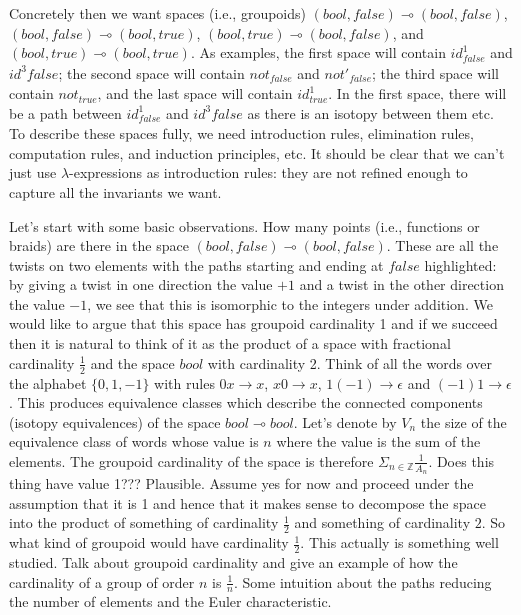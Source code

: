 \documentclass[11pt]{article}
\newcommand{\lolli}{\multimap}
\newcommand{\boolt}{\mathit{bool}}
\newcommand{\ffv}{\mathit{false}}
\newcommand{\ttv}{\mathit{true}}
\newcommand{\notb}{\mathit{not}}
\newcommand{\idc}{\mathit{id}}
\begin{document}
Concretely then we want spaces (i.e., groupoids) $(\boolt,\ffv) \lolli
(\boolt,\ffv)$, $(\boolt,\ffv) \lolli (\boolt,\ttv)$, $(\boolt,\ttv) \lolli
(\boolt,\ffv)$, and $(\boolt,\ttv) \lolli (\boolt,\ttv)$. As examples, the
first space will contain $\idc^1_{\ffv}$ and $\idc^3{\ffv}$; the second space
will contain $\notb_{\ffv}$ and $\notb'_{\ffv}$; the third space will contain
$\notb_{\ttv}$, and the last space will contain $\idc^1_{\ttv}$. In the first
space, there will be a path between $\idc^1_{\ffv}$ and $\idc^3{\ffv}$ as
there is an isotopy between them etc. To describe these spaces fully, we need
introduction rules, elimination rules, computation rules, and induction
principles, etc. It should be clear that we can't just use
$\lambda$-expressions as introduction rules: they are not refined enough to
capture all the invariants we want.

Let's start with some basic observations. How many points (i.e., functions or
braids) are there in the space $(\boolt,\ffv) \lolli (\boolt,\ffv)$. These
are all the twists on two elements with the paths starting and ending at
$\ffv$ highlighted: by giving a twist in one direction the value $+1$ and a
twist in the other direction the value $-1$, we see that this is isomorphic
to the integers under addition. We would like to argue that this space has
groupoid cardinality 1 and if we succeed then it is natural to think of it as
the product of a space with fractional cardinality $\frac{1}{2}$ and the
space $\boolt$ with cardinality 2. Think of all the words over the alphabet
$\{ 0, 1, -1\}$ with rules $0x\rightarrow x$, $x0\rightarrow x$,
$1(-1)\rightarrow\epsilon$ and $(-1)1\rightarrow\epsilon$. This produces
equivalence classes which describe the connected components (isotopy
equivalences) of the space $\boolt\lolli\boolt$. Let's denote by $V_n$ the
size of the equivalence class of words whose value is $n$ where the value is
the sum of the elements. The groupoid cardinality of the space is therefore
$\Sigma_{n\in\mathbb{Z}} \frac{1}{A_n}$. Does this thing have value 1???
Plausible. Assume yes for now and proceed under the assumption that it is 1
and hence that it makes sense to decompose the space into the product of
something of cardinality $\frac{1}{2}$ and something of cardinality $2$. So
what kind of groupoid would have cardinality $\frac{1}{2}$. This actually is
something well studied. Talk about groupoid cardinality and give an example
of how the cardinality of a group of order $n$ is $\frac{1}{n}$. Some
intuition about the paths reducing the number of elements and the Euler
characteristic.
\end{document}
